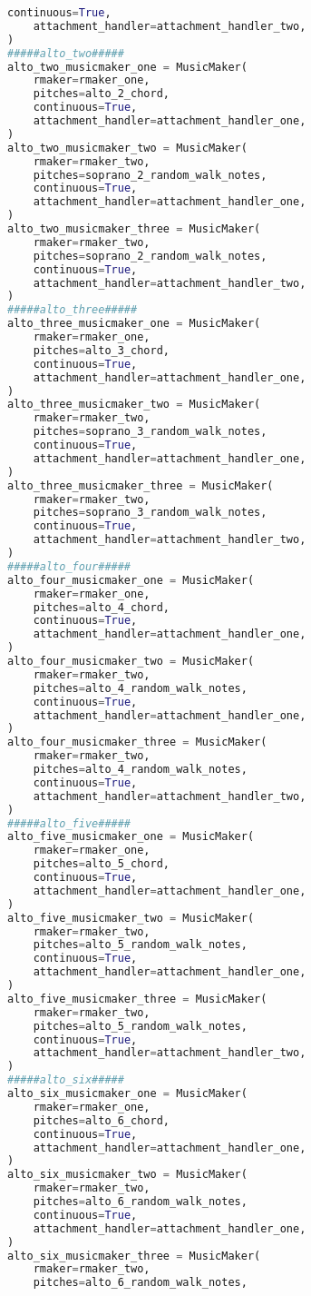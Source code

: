 \begin{lstlisting}[language=Python, caption=Invocation Source Code]
    continuous=True,
    attachment_handler=attachment_handler_two,
)
#####alto_two#####
alto_two_musicmaker_one = MusicMaker(
    rmaker=rmaker_one,
    pitches=alto_2_chord,
    continuous=True,
    attachment_handler=attachment_handler_one,
)
alto_two_musicmaker_two = MusicMaker(
    rmaker=rmaker_two,
    pitches=soprano_2_random_walk_notes,
    continuous=True,
    attachment_handler=attachment_handler_one,
)
alto_two_musicmaker_three = MusicMaker(
    rmaker=rmaker_two,
    pitches=soprano_2_random_walk_notes,
    continuous=True,
    attachment_handler=attachment_handler_two,
)
#####alto_three#####
alto_three_musicmaker_one = MusicMaker(
    rmaker=rmaker_one,
    pitches=alto_3_chord,
    continuous=True,
    attachment_handler=attachment_handler_one,
)
alto_three_musicmaker_two = MusicMaker(
    rmaker=rmaker_two,
    pitches=soprano_3_random_walk_notes,
    continuous=True,
    attachment_handler=attachment_handler_one,
)
alto_three_musicmaker_three = MusicMaker(
    rmaker=rmaker_two,
    pitches=soprano_3_random_walk_notes,
    continuous=True,
    attachment_handler=attachment_handler_two,
)
#####alto_four#####
alto_four_musicmaker_one = MusicMaker(
    rmaker=rmaker_one,
    pitches=alto_4_chord,
    continuous=True,
    attachment_handler=attachment_handler_one,
)
alto_four_musicmaker_two = MusicMaker(
    rmaker=rmaker_two,
    pitches=alto_4_random_walk_notes,
    continuous=True,
    attachment_handler=attachment_handler_one,
)
alto_four_musicmaker_three = MusicMaker(
    rmaker=rmaker_two,
    pitches=alto_4_random_walk_notes,
    continuous=True,
    attachment_handler=attachment_handler_two,
)
#####alto_five#####
alto_five_musicmaker_one = MusicMaker(
    rmaker=rmaker_one,
    pitches=alto_5_chord,
    continuous=True,
    attachment_handler=attachment_handler_one,
)
alto_five_musicmaker_two = MusicMaker(
    rmaker=rmaker_two,
    pitches=alto_5_random_walk_notes,
    continuous=True,
    attachment_handler=attachment_handler_one,
)
alto_five_musicmaker_three = MusicMaker(
    rmaker=rmaker_two,
    pitches=alto_5_random_walk_notes,
    continuous=True,
    attachment_handler=attachment_handler_two,
)
#####alto_six#####
alto_six_musicmaker_one = MusicMaker(
    rmaker=rmaker_one,
    pitches=alto_6_chord,
    continuous=True,
    attachment_handler=attachment_handler_one,
)
alto_six_musicmaker_two = MusicMaker(
    rmaker=rmaker_two,
    pitches=alto_6_random_walk_notes,
    continuous=True,
    attachment_handler=attachment_handler_one,
)
alto_six_musicmaker_three = MusicMaker(
    rmaker=rmaker_two,
    pitches=alto_6_random_walk_notes,

\end{lstlisting}
